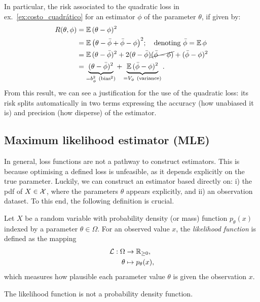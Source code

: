 In particular, the risk associated to the quadratic loss in ex.~\ref{ex:costo_cuadrático} for an estimator $\phi$ of the parameter $\theta$, if given by: 
\begin{alignat}{3}
 	R(\theta, \phi)  &= \E{(\theta - \phi)^2}\nonumber\\
 						& = \E{\left(\theta - \bar{\phi}+ \bar{\phi} -\phi\right)^2}; \quad \text{denoting }\bar{\phi} = \E{ \phi}\nonumber\\
 						& = \E{(\theta - \bar{\phi})^2+2(\theta - \bar{\phi})\cancel{(\bar{\phi} -\phi)} +  (\bar{\phi} -\phi)^2}\nonumber\\
 						& = \underbrace{(\theta - \bar{\phi})^2}_{=b_{\phi}^2\ (\text{bias}^2)} +  \underbrace{\E{(\bar{\phi} -\phi)^2}}_{=V_{\phi}\ \text{(variance)}}.\label{eq:riesgo_cuad}
 \end{alignat} 
 From this result, we can see a justification for the use of the quadratic loss: its risk splits automatically in two terms expressing the accuracy (how unabiased it is) and precision (how disperse) of the estimator.


\subsection{Maximum likelihood estimator (MLE)} %
\label{sec:estimador_de_máxima_verosimilitud}

In general, loss functions are not a pathway to construct estimators. This is because optimising a defined loss is unfeasible, as it depends explicitly on the true parameter. Luckily, we can construct an estimator based directly on: i) the pdf of $X\in{\mathcal X}$, where the parameters $\theta$ appears explicitly, and ii) an observation dataset. To this end, the following definition is crucial.

\begin{definition}
Let $X$ be a random variable with probability density (or mass) function 
$p_\theta(x)$ indexed by a parameter $\theta \in \Omega$. For an observed value 
$x$, the \emph{likelihood function} is defined as the mapping
\begin{align}
    \mathcal{L}: \Omega &\rightarrow \mathbb{R}_{\ge 0},\\
    \theta &\mapsto p_\theta(x),
\end{align}
which measures how plausible each parameter value $\theta$ is given the observation $x$.
\end{definition}

\begin{remark}
The likelihood function is not a probability density function.
\end{remark}

